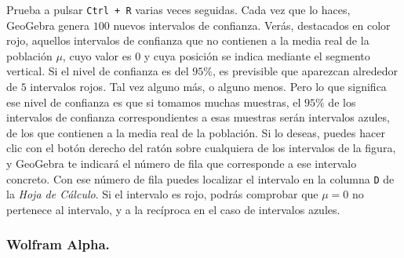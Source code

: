 \documentclass[10pt,a4paper]{article}\usepackage[]{graphicx}\usepackage[]{color}
\newcounter {cont01}
\begin{document}
Prueba a pulsar {\tt Ctrl + R} varias veces seguidas. Cada vez que lo haces, GeoGebra genera $100$ nuevos intervalos de confianza. Verás, destacados en color rojo, aquellos intervalos de confianza que no contienen a la media real de la población $\mu$, cuyo valor es $0$ y cuya posición se indica mediante el segmento vertical. Si el nivel de confianza es del $95\%$, es previsible que aparezcan alrededor de $5$ intervalos rojos. Tal vez alguno más, o alguno menos. Pero lo que significa ese nivel de confianza es que si tomamos muchas muestras, el $95\%$ de los intervalos de confianza correspondientes a esas muestras serán intervalos azules, de los que contienen a la media real de la población. Si lo deseas, puedes hacer clic con el botón derecho del ratón sobre cualquiera de los intervalos de la figura, y GeoGebra te indicará el número de fila que corresponde a ese intervalo concreto. Con ese número de fila puedes localizar el intervalo en la columna {\tt D} de la {\em Hoja de Cálculo}. Si el intervalo es rojo, podrás comprobar que $\mu=0$ no pertenece al intervalo, y a la recíproca en el caso de intervalos azules.

\subsubsection*{Wolfram Alpha.}
\label{tut06:subsubsec:IntConfMediaZWolframAlpha}
\end{document}
